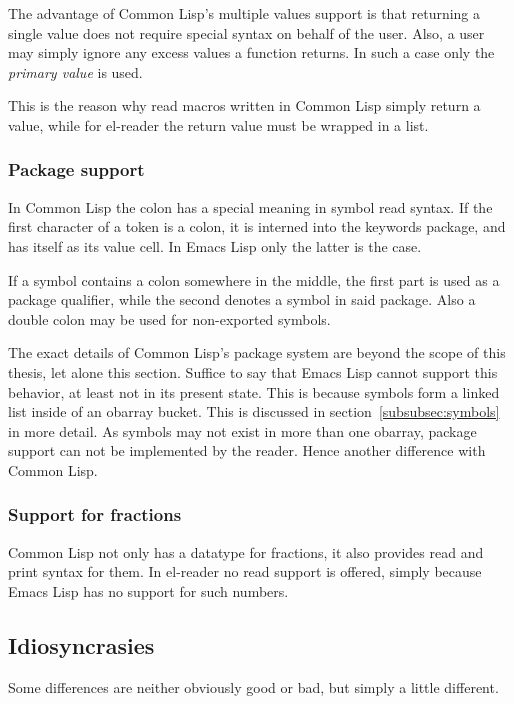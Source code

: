 \documentclass[a4paper,10pt,twoside]{report}
\newcommand{\el}{Emacs Lisp}
\newcommand{\cl}{Common Lisp}
\newcommand{\elr}{el-reader}
\begin{document}
The advantage of \cl{}’s multiple values support is that returning a single
value does not require special syntax on behalf of the user.  Also, a user may
simply ignore any excess values a function returns.  In such a case only the
\emph{primary value} is used.

This is the reason why read macros written in \cl{} simply return a value, while
for \elr{} the return value must be wrapped in a list.

\subsubsection{Package support}
\label{subsubsec:package-support}

In \cl{} the colon has a special meaning in symbol read syntax.  If the first
character of a token is a colon, it is interned into the keywords package, and
has itself as its value cell.  In \el{} only the latter is the case.

If a symbol contains a colon somewhere in the middle, the first part is used as
a package qualifier, while the second denotes a symbol in said package.  Also a
double colon may be used for non-exported symbols.

The exact details of \cl{}’s package system are beyond the scope of this thesis,
let alone this section.  Suffice to say that \el{} cannot support this behavior,
at least not in its present state.  This is because symbols form a linked list
inside of an obarray bucket.  This is discussed in
section~\ref{subsubsec:symbols} in more detail.  As symbols may not exist in
more than one obarray, package support can not be implemented by the reader.
Hence another difference with \cl{}.

\subsubsection{Support for fractions}
\label{subsubsec:fractions}

\cl{} not only has a datatype for fractions, it also provides read and print
syntax for them.  In \elr{} no read support is offered, simply because \el{} has
no support for such numbers.

\subsection{Idiosyncrasies}
\label{subsec:idiosyncrasies}

Some differences are neither obviously good or bad, but simply a little
different.
\end{document}
